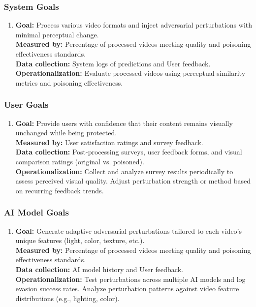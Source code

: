 \subsubsection{System Goals}
\begin{enumerate}
    \item 
    \textbf{Goal:}
    Process various video formats and inject adversarial perturbations with minimal perceptual change. \\
    \textbf{Measured by:} 
    Percentage of processed videos meeting quality and poisoning effectiveness standards. \\
    \textbf{Data collection:}
    System logs of predictions and User feedback. \\
    \textbf{Operationalization:} 
    Evaluate processed videos using perceptual similarity metrics and poisoning effectiveness.
\end{enumerate}

\subsubsection{User Goals}
\begin{enumerate}
    \item 
    \textbf{Goal:}
    Provide users with confidence that their content remains visually unchanged while being protected. \\
    \textbf{Measured by:} 
    User satisfaction ratings and survey feedback. \\
    \textbf{Data collection:}
    Post-processing surveys, user feedback forms, and visual comparison ratings (original vs. poisoned). \\
    \textbf{Operationalization:} 
    Collect and analyze survey results periodically to assess perceived visual quality. Adjust perturbation strength or method based on recurring feedback trends.
\end{enumerate}

\subsubsection{AI Model Goals}
\begin{enumerate}
    \item 
    \textbf{Goal:}
    Generate adaptive adversarial perturbations tailored to each video's unique features (light, color, texture, etc.). \\
    \textbf{Measured by:} 
    Percentage of processed videos meeting quality and poisoning effectiveness standards. \\
    \textbf{Data collection:}
    AI model history and User feedback. \\
    \textbf{Operationalization:} 
    Test perturbations across multiple AI models and log evasion success rates. Analyze perturbation patterns against video feature distributions (e.g., lighting, color).
\end{enumerate}


